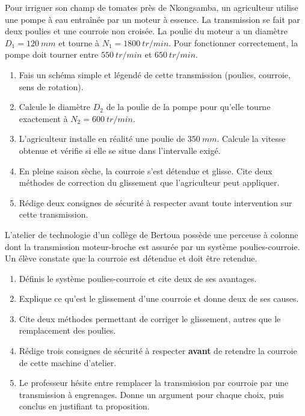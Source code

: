 \documentclass[11pt]{article}
\begin{document}
\begin{exercice}
Pour irriguer son champ de tomates près de Nkongsamba, un agriculteur utilise une pompe à eau entraînée par un moteur à essence. La transmission se fait par deux poulies et une courroie non croisée. La poulie du moteur a un diamètre $D_1 = \SI{120}{mm}$ et tourne à $N_1 = \SI{1800}{tr/min}$. Pour fonctionner correctement, la pompe doit tourner entre $\SI{550}{tr/min}$ et $\SI{650}{tr/min}$.
\begin{enumerate}
\item Fais un schéma simple et légendé de cette transmission (poulies, courroie, sens de rotation).
\item Calcule le diamètre $D_2$ de la poulie de la pompe pour qu'elle tourne exactement à $N_2 = \SI{600}{tr/min}$.
\item L'agriculteur installe en réalité une poulie de $\SI{350}{mm}$. Calcule la vitesse obtenue et vérifie si elle se situe dans l'intervalle exigé.
\item En pleine saison sèche, la courroie s'est détendue et glisse. Cite deux méthodes de correction du glissement que l'agriculteur peut appliquer.
\item Rédige deux consignes de sécurité à respecter avant toute intervention sur cette transmission.
\end{enumerate}
\end{exercice}

\begin{exercice}
L'atelier de technologie d'un collège de Bertoua possède une perceuse à colonne dont la transmission moteur-broche est assurée par un système poulies-courroie. Un élève constate que la courroie est détendue et doit être retendue.
\begin{enumerate}
\item Définis le système poulies-courroie et cite deux de ses avantages.
\item Explique ce qu'est le glissement d'une courroie et donne deux de ses causes.
\item Cite deux méthodes permettant de corriger le glissement, autres que le remplacement des poulies.
\item Rédige trois consignes de sécurité à respecter \textbf{avant} de retendre la courroie de cette machine d'atelier.
\item Le professeur hésite entre remplacer la transmission par courroie par une transmission à engrenages. Donne un argument pour chaque choix, puis conclus en justifiant ta proposition.
\end{enumerate}
\end{exercice}
\end{document}

